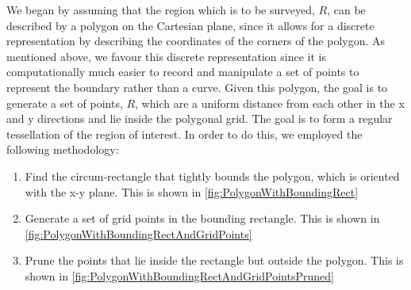 We began by assuming that the region which is to be surveyed, $R$, can be described by a polygon on the Cartesian plane, since it allows for a discrete representation by describing the coordinates of the corners of the polygon. As mentioned above, we favour this discrete representation since it is computationally much easier to record and manipulate a set of points to represent the boundary rather than a curve. Given this polygon, the goal is to generate a set of points, $R$, which are a uniform distance from each other in the x and y directions and lie inside the polygonal grid. The goal is to form a regular tessellation of the region of interest. In order to do this, we employed the following methodology:
\begin{enumerate}
    \item Find the circum-rectangle that tightly bounds the polygon, which is oriented with the x-y plane. This is shown in \ref{fig:PolygonWithBoundingRect}
    \item Generate a set of grid points in the bounding rectangle. This is shown in \ref{fig:PolygonWithBoundingRectAndGridPoints}
    \item Prune the points that lie inside the rectangle but outside the polygon. This is shown in \ref{fig:PolygonWithBoundingRectAndGridPointsPruned}
\end{enumerate}


